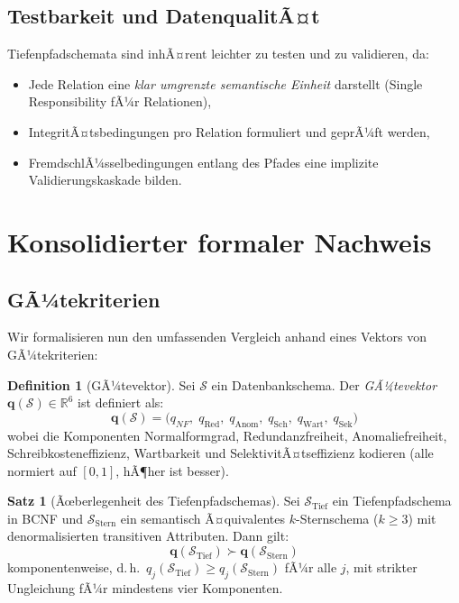 ﻿\documentclass[a4paper,12pt]{report}
\theoremstyle{definition}
\newtheorem{definition}{Definition}[chapter]
\newtheorem{theorem}{Satz}[chapter]
\theoremstyle{remark}
\newcommand{\NF}{\mathit{NF}}
\begin{document}
\subsection{Testbarkeit und DatenqualitÃ¤t}

Tiefenpfadschemata sind inhÃ¤rent leichter zu testen und zu validieren,
da:
\begin{itemize}
  \item Jede Relation eine \emph{klar umgrenzte semantische Einheit} darstellt
        (Single Responsibility fÃ¼r Relationen),
  \item IntegritÃ¤tsbedingungen pro Relation formuliert und geprÃ¼ft werden,
  \item FremdschlÃ¼sselbedingungen entlang des Pfades eine implizite
        Validierungskaskade bilden.
\end{itemize}

\section{Konsolidierter formaler Nachweis}
\label{sec:beweis}

\subsection{GÃ¼tekriterien}

Wir formalisieren nun den umfassenden Vergleich anhand eines Vektors von
GÃ¼tekriterien:

\begin{definition}[GÃ¼tevektor]
Sei $\mathcal{S}$ ein Datenbankschema. Der \emph{GÃ¼tevektor}
$\mathbf{q}(\mathcal{S}) \in \mathbb{R}^6$ ist definiert als:
\[
  \mathbf{q}(\mathcal{S}) = \bigl(
    q_{\NF},\; q_{\text{Red}},\; q_{\text{Anom}},\;
    q_{\text{Sch}},\; q_{\text{Wart}},\; q_{\text{Sek}}
  \bigr)
\]
wobei die Komponenten Normalformgrad, Redundanzfreiheit,
Anomaliefreiheit, Schreibkosteneffizienz, Wartbarkeit und
SelektivitÃ¤tseffizienz kodieren (alle normiert auf $[0,1]$,
hÃ¶her ist besser).
\end{definition}

\begin{theorem}[Ãœberlegenheit des Tiefenpfadschemas]
\label{thm:hauptsatz}
Sei $\mathcal{S}_{\text{Tief}}$ ein Tiefenpfadschema in BCNF und
$\mathcal{S}_{\text{Stern}}$ ein semantisch Ã¤quivalentes $k$-Sternschema
($k \geq 3$) mit denormalisierten transitiven Attributen. Dann gilt:
\[
  \mathbf{q}(\mathcal{S}_{\text{Tief}}) \succ \mathbf{q}(\mathcal{S}_{\text{Stern}})
\]
komponentenweise, d.\,h.\ $q_j(\mathcal{S}_{\text{Tief}}) \geq q_j(\mathcal{S}_{\text{Stern}})$
fÃ¼r alle $j$, mit strikter Ungleichung fÃ¼r mindestens vier Komponenten.
\end{theorem}
\end{document}
